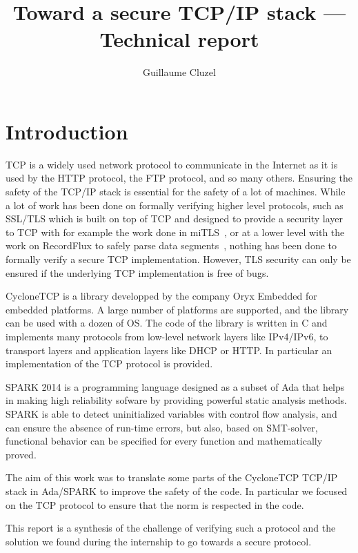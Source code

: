 \documentclass[a4paper, 10pt]{article}
\author{Guillaume Cluzel}
\title{Toward a secure TCP/IP stack --- Technical report}
\begin{document}
    \maketitle

    \tableofcontents

    \section{Introduction}

    TCP is a widely used network protocol to communicate in the Internet as
    it is used by the HTTP protocol, the FTP protocol, and so many others.
    Ensuring the safety of the TCP/IP stack is essential for the safety of
    a lot of machines. While a lot of work has been done on formally verifying higher level
    protocols, such as SSL/TLS which is built on top of TCP and designed
    to provide a security layer to TCP with for example the work done in
    miTLS~\cite{bhargavan2013implementing}, or at a lower level with the work
    on RecordFlux to safely parse data segments~\cite{Reiher_2020}, nothing has
    been done to formally verify a secure TCP implementation. However, TLS security
    can only be ensured if the underlying TCP implementation is free of bugs.

    CycloneTCP is a library developped by the company Oryx Embedded for embedded platforms.
    A large number of platforms are supported, and the library can be used
    with a dozen of OS. The code of the library is written in C and implements
    many protocols from low-level network layers like IPv4/IPv6, to transport layers
    and application layers like DHCP or HTTP. In particular an implementation of
    the TCP protocol is provided.

    SPARK 2014 is a programming language designed as a subset of Ada that helps in
    making high reliability sofware by providing powerful static analysis methods.
    SPARK is able to detect uninitialized variables with control flow analysis,
    and can ensure the absence of run-time errors,
    but also, based on SMT-solver, functional behavior can be specified for every
    function and mathematically proved.

    The aim of this work was to translate some parts of the CycloneTCP TCP/IP stack
    in Ada/SPARK to improve the safety of the code. In particular we focused
    on the TCP protocol to ensure that the norm is respected in the code.

    This report is a synthesis of the challenge of verifying such a protocol
    and the solution we found during the internship to go towards a secure protocol.
\end{document}
